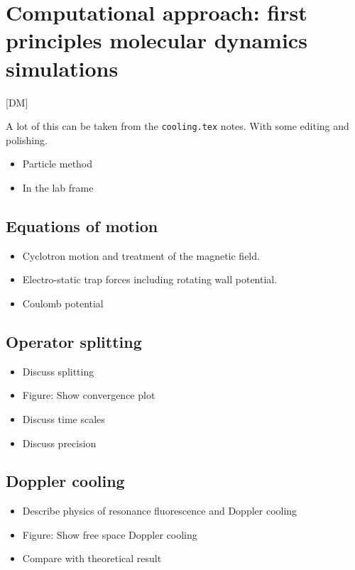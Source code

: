 \documentclass[aps, pra, preprint]{revtex4-1}
\newenvironment{comment}[1]{
    \begin{adjustwidth}{5cm}{-1.5cm}
        \singlespace
        \small
        [#1]
        \it
}
{
    \end{adjustwidth}
}
\begin{document}
\section{Computational approach: first principles molecular
dynamics simulations}

\begin{comment}{DM}
    A lot of this can be taken from the {\tt cooling.tex}
    notes. With some editing and polishing.
\end{comment}


\begin{itemize}
    \item Particle method
    \item In the lab frame
\end{itemize}


\subsection{Equations of motion}

\begin{itemize}
    \item Cyclotron motion and treatment of the magnetic
        field.
    \item Electro-static trap forces including rotating wall
        potential.
    \item Coulomb potential
\end{itemize}


\subsection{Operator splitting}

\begin{itemize}
    \item Discuss splitting
    \item Figure: Show convergence plot
    \item Discuss time scales
    \item Discuss precision
\end{itemize}


\subsection{Doppler cooling}

\begin{itemize}
    \item Describe physics of resonance fluorescence and
        Doppler cooling
    \item Figure: Show free space Doppler cooling
    \item Compare with theoretical result
\end{itemize}
\end{document}
